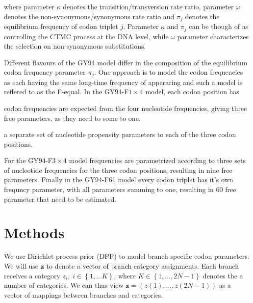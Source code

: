 \noindent
where parameter $\kappa$ denotes the transition/transversion rate ratio, parameter $\omega$ denotes the non-synonymous/synonymous
rate ratio and $\pi_j$ denotes the equilibrium frequency of codon triplet $j$.
Parameter $\kappa$ and $\pi_j$ can be though of as controlling the CTMC process at the DNA level, while $\omega$ parameter characterizes the selection on non-synonymous substitutions.

Different flavours of the GY94 model differ in the composition of the equilibrium codon frequency parameter $\pi_{j}$.
One approach is to model the codon frequencies as each having the same long-time frequency of apperaring and such a model is reffered to as the F-equal.
In the GY94-F$1\times4$ model, each codon position has 


codon frequencies are expected from the four nucleotide frequencies, giving three free parameters, as they need to some to one.

a separate set of nucleotide propensity parameters to each of the three codon positions.



For the GY94-F$3\times4$ model frequencies are parametrized according to three sets of nucleotide frequencies for the three codon positions, resulting in nine free parameters.
Finally in the GY94-F61 model every codon triplet has it's own frequncy parameter, with all parameters summing to one, resulting in 60 free parameter that need to be estimated.





















\section{Methods}




We use Dirichlet process prior (DPP) to model branch specific codon parameters.
We will use $\mathbf{z}$ to denote a vector of branch category assignments.
Each branch receives a category $z_{i},\; i\in\left\{ 1,\ldots K\right\}$, where $K\in\left\{ 1,\ldots,2N-1\right\}$ denotes the a number of categories.
We can thus view $\mathbf{z}=\left(z(1),\ldots,z(2N-1)\right)$ as a vector of mappings between branches and categories.
 
